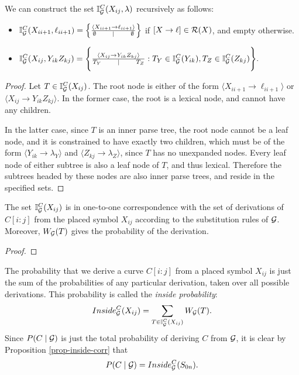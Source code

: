 \documentclass{article}
\newcommand\Inner{\mathbb{I}}
\begin{document}
\begin{prop}
\label{prop-induct-inside}
We can construct the set $\Inner_\GGG^C(X_{ij}, \lambda)$ recursively
as follows:
\begin{itemize}
\item $\Inner_\GGG^C(X_{i i+1}, \ell_{i i+1}) = \left\{ \frac{ \langle
      X_{i i+1} \to \ell_{i i+1} \rangle}{ \emptyset \qquad \mid
      \qquad \emptyset } \right\}$
if $[X\to \ell] \in {\mathcal R}(X)$, and empty otherwise.
\item 
$    \Inner_\GGG^C(X_{ij}, Y_{ik} Z_{kj}) = \Bigg\{ \frac{\langle
  X_{ij} \to Y_{ik}Z_{kj} \rangle}{ T_Y \qquad \mid \qquad T_Z} : 
 T_Y\in
      \Inner_\GGG^C(Y_{ik}), T_Z \in \Inner_\GGG^C(Z_{kj}) \Bigg\}.
$
\end{itemize}
\end{prop}
\begin{proof}
  Let $T\in \Inner_\GGG^C(X_{ij})$. The root node is either of the
  form $\langle X_{i i+1} \to \ell_{i i+1}\rangle$ or $\langle X_{i
    j}\to Y_{i k} Z_{k j}\rangle$. In the former case, the root is a lexical
  node, and cannot have any children.

  In the latter case, since $T$ is an inner parse tree, the root node
  cannot be a leaf node, and it is constrained to have exactly two
  children, which must be of the form $\langle Y_{ik}\to
  \lambda_Y\rangle$ and $\langle Z_{kj} \to \lambda_Z \rangle$, since
  $T$ has no unexpanded nodes. Every leaf node of either subtree is
  also a leaf node of $T$, and thus lexical. Therefore the subtrees
  headed by these nodes are also inner parse trees, and reside in the
  specified sets.
\end{proof}

\begin{prop}
\label{prop-inside-corr}
  The set $\Inner_\GGG^C(X_{ij})$ is in one-to-one correspondence with
  the set of derivations of $C[i:j]$ from the placed symbol $X_{ij}$
  according to the substitution rules of ${\mathcal G}$. Moreover, $W_{{\mathcal G}}(T)$
  gives the probability of the derivation.
\end{prop}
\begin{proof}
\end{proof}

The probability that we derive a curve $C[i:j]$ from a placed symbol
$X_{ij}$ is just the sum of the probabilities of any particular
derivation, taken over all possible derivations. This probability is
called the \emph{inside probability}:
$$Inside_\GGG^C(X_{i j}) =  \sum_{T\in \Inner_\GGG^C(X_{ij})}W_\GGG(T).$$
Since $P(C\mid {\mathcal G})$ is just the total probability of deriving $C$
from ${\mathcal G}$, it is clear by Proposition \ref{prop-inside-corr} that 
$$P(C\mid {\mathcal G}) = Inside_{{\mathcal G}}^C(S_{0 n}).$$
\end{document}
